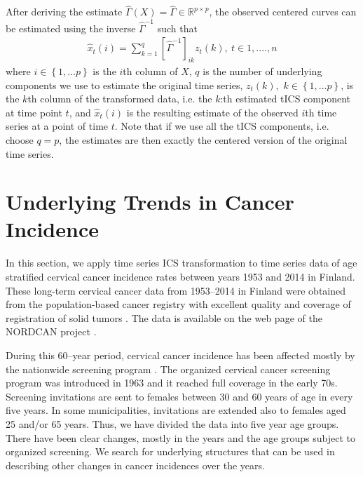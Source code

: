 \documentclass{llncs}
\begin{document}
After deriving the estimate $\hat{\Gamma}\left(X\right) = \hat{\Gamma}\in \mathbb{R}^{p\times p}$,  the observed centered curves can be  estimated using the inverse $\hat{\Gamma}^{-1}$ such that
\begin{align}
\label{estimation}
\hat{x}_t\left(i\right)= \sum_{k=1}^q  \left[\hat{\Gamma}^{-1}\right]_{ik} z_t\left(k\right) , \ t\in {1, ...., n}
\end{align}
where $i \in \left\{1,\ldots p\right\}$ is the $i$th column of $X$, $q$ is the number of underlying components we  use to estimate the original time series, $z_t\left(k\right),$ $k \in \left\{1,\ldots p\right\}$, is the $k$th column of the transformed data, i.e. the $k$:th estimated tICS component at time point $t$, and $\hat{x}_t\left(i\right)$ is the resulting estimate of the observed $i$th time series at a point of time $t$. Note that if we use all the tICS components, i.e. choose $q=p$, the estimates are then exactly the centered version of the original time series.



\section{Underlying Trends in Cancer Incidence}\label{data}
In this section, we apply time series ICS transformation to time series data of age stratified cervical cancer incidence rates between years 1953 and 2014 in Finland.
These long-term cervical cancer data from 1953--2014 in Finland were obtained from the population-based cancer registry with excellent quality and coverage of registration of solid tumors \cite{leinonen2016,teppo1994}. The data is available on  the web page of the NORDCAN project \cite{engholm2010}.

During this 60--year period, cervical cancer incidence has been affected mostly by the nationwide screening program \cite{hakama1975}. The organized cervical cancer screening program was introduced in 1963 and it reached full coverage in the early 70s. Screening invitations are sent to females between 30 and 60 years of age in every five years. In some municipalities, invitations are extended also to females aged 25 and/or 65 years. Thus, we have divided the data into five year age groups.  There have been clear changes, mostly in the years and the age groups subject to organized screening. We  search for underlying structures that can be used in describing other changes in cancer incidences over the years. 
 
\end{document}
